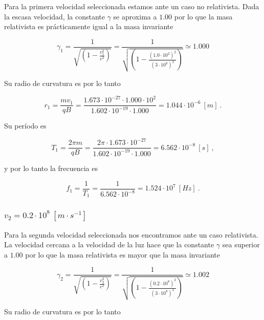 \documentclass[journal]{IEEEtran}
\begin{document}
Para la primera velocidad seleccionada estamos ante un caso no relativista. Dada la escasa velocidad, la constante $\gamma$ se aproxima a $1.00$ por lo que la masa relativista es prácticamente igual a la masa invariante

\begin{equation}
\gamma_1 = \displaystyle\frac{1}{\sqrt{(1-\displaystyle\frac{v_1^2}{c^2})}} = \displaystyle\frac{1}{\sqrt{(1-\displaystyle\frac{(1.0\cdot 10^2)^2}{(3\cdot 10^8)^2})}} \simeq 1.000
\end{equation}

Su radio de curvatura es por lo tanto

\begin{equation}
r_1 = \displaystyle\frac{mv_1}{qB} = \displaystyle\frac{1.673\cdot 10^{-27}\cdot 1.000\cdot 10^2}{1.602\cdot 10^{-19}\cdot 1.000} = 1.044\cdot 10^{-6}~[m]~.
\end{equation}

Su período es

\begin{equation}
T_1 = \displaystyle\frac{2\pi m}{qB} = \displaystyle\frac{2\pi \cdot 1.673\cdot 10^{-27}}{1.602\cdot 10^{-19}\cdot 1.000} = 6.562\cdot 10^{-8}~[s]~,
\end{equation}

y por lo tanto la frecuencia es

\begin{equation}
f_1 = \displaystyle\frac{1}{T_1} = \displaystyle\frac{1}{6.562\cdot 10^{-8}} = 1.524\cdot 10^7~[Hz]~.
\end{equation}

\subsubsection{$v_2 = 0.2\cdot 10^8~[m\cdot s^{-1}]$}

Para la segunda velocidad seleccionada nos encontramos ante un caso relativista. La velocidad cercana a la velocidad de la luz hace que la constante $\gamma$ sea superior a $1.00$ por lo que la masa relativista es mayor que la masa invariante 

\begin{equation}
\gamma_2 = \displaystyle\frac{1}{\sqrt{(1-\displaystyle\frac{v_2^2}{c^2})}} = \displaystyle\frac{1}{\sqrt{(1-\displaystyle\frac{(0.2\cdot 10^8)^2}{(3\cdot 10^8)^2})}} \simeq 1.002
\end{equation}

Su radio de curvatura es por lo tanto
\end{document}
